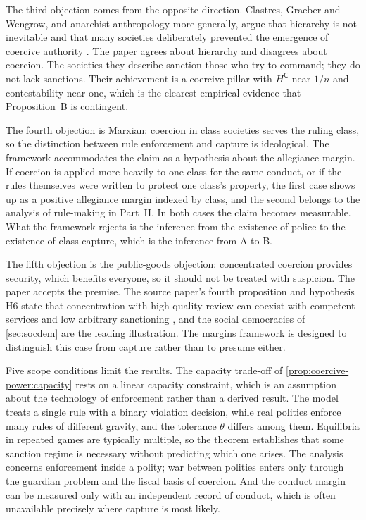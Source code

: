 \documentclass[11pt,letterpaper]{article}
\theoremstyle{definition}
\theoremstyle{remark}
\newcommand{\pC}{\mathsf{C}}
\begin{document}
The third objection comes from the opposite direction. Clastres, Graeber and Wengrow, and anarchist anthropology more generally, argue that hierarchy is not inevitable and that many societies deliberately prevented the emergence of coercive authority \citep{clastres1987,graeber2021}. The paper agrees about hierarchy and disagrees about coercion. The societies they describe sanction those who try to command; they do not lack sanctions. Their achievement is a coercive pillar with $H^{\pC}$ near $1/n$ and contestability near one, which is the clearest empirical evidence that Proposition~B is contingent.

The fourth objection is Marxian: coercion in class societies serves the ruling class, so the distinction between rule enforcement and capture is ideological. The framework accommodates the claim as a hypothesis about the allegiance margin. If coercion is applied more heavily to one class for the same conduct, or if the rules themselves were written to protect one class's property, the first case shows up as a positive allegiance margin indexed by class, and the second belongs to the analysis of rule-making in Part~II. In both cases the claim becomes measurable. What the framework rejects is the inference from the existence of police to the existence of class capture, which is the inference from A to B.

The fifth objection is the public-goods objection: concentrated coercion provides security, which benefits everyone, so it should not be treated with suspicion. The paper accepts the premise. The source paper's fourth proposition and hypothesis H6 state that concentration with high-quality review can coexist with competent services and low arbitrary sanctioning \citep{largo2026hbs}, and the social democracies of \cref{sec:socdem} are the leading illustration. The margins framework is designed to distinguish this case from capture rather than to presume either.

Five scope conditions limit the results. The capacity trade-off of \cref{prop:coercive-power:capacity} rests on a linear capacity constraint, which is an assumption about the technology of enforcement rather than a derived result. The model treats a single rule with a binary violation decision, while real polities enforce many rules of different gravity, and the tolerance $\theta$ differs among them. Equilibria in repeated games are typically multiple, so the theorem establishes that some sanction regime is necessary without predicting which one arises. The analysis concerns enforcement inside a polity; war between polities enters only through the guardian problem and the fiscal basis of coercion. And the conduct margin can be measured only with an independent record of conduct, which is often unavailable precisely where capture is most likely.
\end{document}
